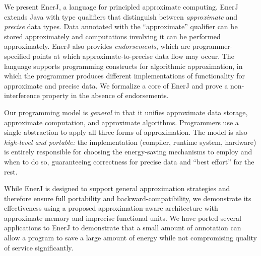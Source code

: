 We present EnerJ, a language for principled approximate
computing.
EnerJ extends Java
with type qualifiers that distinguish between
\emph{approximate} and \emph{precise} data types.
Data annotated with the ``approximate'' qualifier can be stored
approximately and computations involving it can be performed
approximately. EnerJ also provides \emph{endorsements}, which are
programmer-specified points at which approximate-to-precise data flow
may occur. The language supports programming constructs for
algorithmic approximation, in which the programmer produces different
implementations of functionality for approximate and precise data.
We formalize a core of EnerJ and prove a
non-interference property in the absence of endorsements.



Our programming model is \emph{general} in that it unifies approximate
data storage, approximate computation, and approximate algorithms.
Programmers use a single abstraction to apply all three
forms of approximation.
The model is also \emph{high-level and
portable:} the implementation (compiler, runtime system, hardware)
is entirely responsible for choosing the energy-saving mechanisms to
employ and when to do so, guaranteeing correctness for precise data
and ``best effort'' for the rest.

While EnerJ is designed to support general approximation strategies
and therefore ensure full portability and backward-compatibility, we
demonstrate its effectiveness using a proposed approximation-aware
architecture with approximate memory and imprecise
functional units. We have ported several applications to EnerJ to
demonstrate that a small amount of annotation can allow a program to
save a large amount of energy while not compromising quality of
service significantly.

